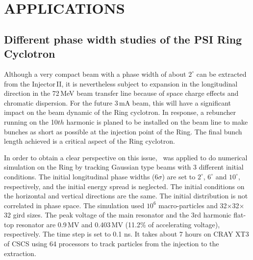 \documentclass[aps,prstab,twocolumn,superscriptaddress,showpacs]{revtex4}
\begin{document}


\section{APPLICATIONS}

\subsection{Different phase width studies of the PSI Ring Cyclotron}

Although a very compact beam with a phase width of about $2^\circ$ can be extracted from the Injector\,II, it is nevertheless subject to expansion in the longitudinal direction in the 72\,MeV 
beam transfer line because of space charge effects and chromatic dispersion. For the future 3\,mA beam, this will have a significant impact on the beam dynamic of the Ring cyclotron.
In response, a rebuncher running on the 10$th$ harmonic is planed to be installed on the beam line to make bunches as short as possible at the injection point of the Ring.
The final bunch length achieved is a critical aspect of the Ring cyclotron.

In order to obtain a clear perspective on this issue, \opalcycl \  was applied to do numerical simulation on the Ring  by tracking Gaussian type beams with 3
different initial conditions. The initial longitudinal phase widths (6$\sigma$) are set to $2^\circ$, $6^\circ$ and $10^\circ$, respectively,
and the initial energy spread is neglected.
The initial conditions on the horizontal and vertical directions are the same. 
The initial distribution is not correlated in phase space.
The simulation used $10^6$ macro-particles and 32$\times$32$\times$32 gird sizes. The peak voltage of the main resonator and the 3rd harmonic flat-top resonator are 0.9\,MV and
0.403\,MV (11.2\% of accelerating voltage), respectively. The time step is set to 0.1 ns. It takes about 7 hours on CRAY XT3 of CSCS using 64 processors to track particles from the 
injection to the extraction.
\end{document}
